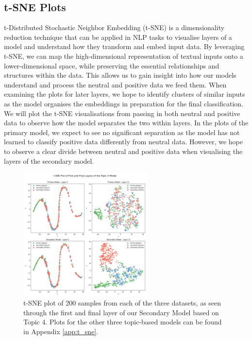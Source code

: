 \subsection{t-SNE Plots}

t-Distributed Stochastic Neighbor Embedding (t-SNE) is a dimensionality reduction technique \cite{tsne_paper} that can be applied in NLP tasks to visualise layers of a model and understand how they transform and embed input data. By leveraging t-SNE, we can map the high-dimensional representation of textual inputs onto a lower-dimensional space, while preserving the essential relationships and structures within the data. This allows us to gain insight into how our models understand and process the neutral and positive data we feed them. When examining the plots for later layers, we hope to identify clusters of similar inputs as the model organises the embeddings in preparation for the final classification. We will plot the t-SNE visualisations from passing in both neutral and positive data to observe how the model separates the two within layers. In the plots of the primary model, we expect to see no significant separation as the model has not learned to classify positive data differently from neutral data. However, we hope to observe a clear divide between neutral and positive data when visualising the layers of the secondary model.

\begin{figure}[ht]
    \centering
    \includegraphics[width=0.6\textwidth]{graphs/tsne/topic_4.png}
    \caption{t-SNE plot of 200 samples from each of the three datasets, as seen through the first and final layer of our Secondary Model based on Topic 4. Plots for the other three topic-based models can be found in Appendix \ref{app:t_sne}.}
    \label{fig:t_sne_plot}
\end{figure}

